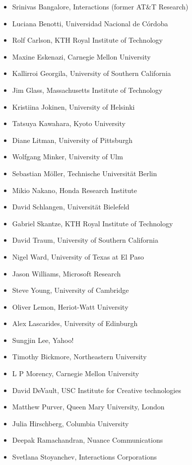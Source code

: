 \documentclass[12pt]{article}
\begin{document}
\begin{itemize}
\item Srinivas Bangalore, Interactions (former AT\&T Research)
\item Luciana Benotti, Universidad Nacional de Córdoba
\item Rolf Carlson, KTH Royal Institute of Technology
\item Maxine Eskenazi, Carnegie Mellon University
\item Kallirroi Georgila, University of Southern California
\item Jim Glass, Massachusetts Institute of Technology
\item Kristiina Jokinen, University of Helsinki
\item Tatsuya Kawahara, Kyoto University
\item Diane Litman, University of Pittsburgh
\item Wolfgang Minker, University of Ulm
\item Sebastian Möller, Technische Universität Berlin
\item Mikio Nakano, Honda Research Institute
\item David Schlangen, Universität Bielefeld
\item Gabriel Skantze, KTH Royal Institute of Technology
\item David Traum, University of Southern California
\item Nigel Ward, University of Texas at El Paso
\item Jason Williams, Microsoft Research
\item Steve Young, University of Cambridge
\item Oliver Lemon, Heriot-Watt University
\item Alex Lascarides, University of Edinburgh
\item Sungjin Lee, Yahoo!
\item Timothy Bickmore, Northeastern University
\item L P Morency, Carnegie Mellon University
\item David DeVault, USC Institute for Creative technologies
\item Matthew Purver, Queen Mary University, London
\item Julia Hirschberg, Columbia University
\item Deepak Ramachandran, Nuance Communications
\item Svetlana Stoyanchev, Interactions Corporations
\end{itemize}
\pagebreak
\end{document}
